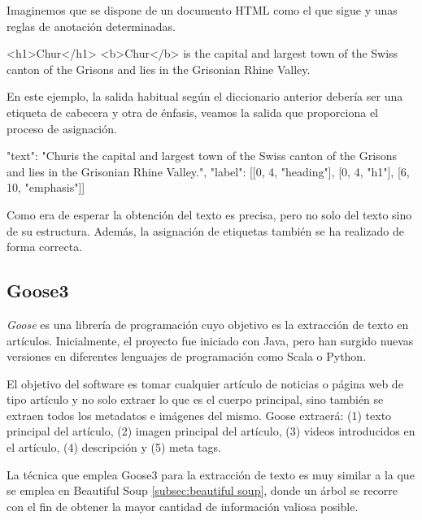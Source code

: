 Imaginemos que se dispone de un documento HTML como el que sigue y unas reglas de anotación determinadas.

\begin{Schunk}
  \begin{Soutput}
    <h1>Chur</h1>
    <b>Chur</b> is the capital and largest town of the Swiss canton of the Grisons 
    and lies in the Grisonian Rhine Valley.
  \end{Soutput}
\end{Schunk}

En este ejemplo, la salida habitual según el diccionario anterior debería ser una etiqueta de cabecera y
otra de énfasis, veamos la salida que proporciona el proceso de asignación.

\begin{Schunk}
  \begin{Soutput}
    {"text": "Chur\n\nChur is the capital and largest town of the Swiss canton
          of the Grisons and lies in the Grisonian Rhine Valley.",
    "label": [[0, 4, "heading"], [0, 4, "h1"], [6, 10, "emphasis"]]}
  \end{Soutput}
\end{Schunk}

Como era de esperar la obtención del texto es precisa, pero no solo del texto sino de su estructura. Además,
la asignación de etiquetas también se ha realizado de forma correcta.

\subsection{Goose3}
\label{subsec:goose3}

\emph{Goose} \cite{goose3} es una librería de programación cuyo objetivo es la extracción de texto en 
artículos. Inicialmente, el proyecto fue iniciado con Java, pero han surgido nuevas versiones en diferentes 
lenguajes de programación como Scala o Python.

El objetivo del software es tomar cualquier artículo de noticias o página web de tipo artículo y no solo
extraer lo que es el cuerpo principal, sino también se extraen todos los metadatos e imágenes del mismo.
Goose extraerá: (1) texto principal del artículo, (2) imagen principal del artículo, (3) videos introducidos
en el artículo, (4) descripción y (5) meta tags.

La técnica que emplea Goose3 para la extracción de texto es muy similar a la que se emplea en Beautiful Soup
\ref{subsec:beautiful soup}, donde un árbol se recorre con el fin de obtener la mayor cantidad de información
valiosa posible.

